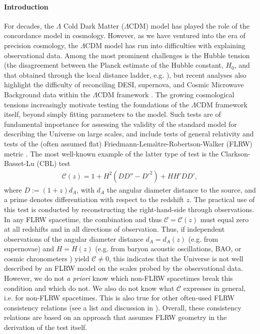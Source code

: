 \documentclass[reprint,aps,prd,nofootinbib,a4paper,10pt,twocolumn,superscriptaddress]{revtex4-2}
\begin{document}
\paragraph*{Introduction}
For decades, the $\Lambda$ Cold Dark Matter ($\Lambda$CDM) model has played the role of the concordance model in cosmology. However, as we have ventured into the era of precision cosmology, the $\Lambda$CDM model has run into difficulties with explaining observational data. Among the most prominent challenges is the Hubble tension (the disagreement between the Planck estimate of the Hubble constant, $H_0$, \cite{planck} and that obtained through the local distance ladder, e.g. \cite{local}), but recent analyses also highlight the difficulty of reconciling DESI, supernova, and Cosmic Microwave Background data within the $\Lambda$CDM framework \cite{DESI:2024mwx}.
\newline\indent
The growing cosmological tensions increasingly motivate testing the foundations of the $\Lambda$CDM framework itself, beyond simply fitting parameters to the model. Such tests are of fundamental importance for assessing the validity of the standard model for describing the Universe on large scales, and include tests of general relativity \cite{Ferreira:2019xrr,GRtest1, GRtest2, GRtest3, Thomas:2025qiz} and tests of the (often assumed flat) Friedmann-Lema\^{\i}tre-Robertson-Walker (FLRW) metric \cite{FLRWtest1, FLRWtest2, Montanari:2017yma, FLRWtest3, cbl, Larena:2008be, Seikel_2012}.
The most well-known example of the latter type of test is the Clarkson-Basset-Lu (CBL) test \cite{cbl}
\begin{align}
\label{eq:C}
    \mathcal{C}(z) = 1 + H^2\left(DD'' - D'^2\right) + HH'DD',
\end{align}
where $D:=(1+z)d_A$, with $d_A$ the angular diameter distance to the source, and a prime denotes differentiation with respect to the redshift $z$. The practical use of this test is conducted by reconstructing the right-hand-side through observations.
In any FLRW spacetime, the combination and thus $\mathcal{C} = \mathcal{C}(z)$ must equal zero at all redshifts and in all directions of observation. Thus, if independent observations of the angular diameter distance $d_A=d_A(z)$ (e.g. from supernovae) and $H=H(z)$ (e.g. from baryon acoustic oscillations, BAO, or cosmic chronometers \cite{Moresco:2022phi}) yield $\mathcal{C}\neq 0$, this indicates that the Universe is not well described by an FLRW model on the scales probed by the observational data. However, we do not {\em a priori} know which non-FLRW spacetimes break this condition and which do not. We also do not know what $\mathcal{C}$ expresses in general, i.e. for non-FLRW spacetimes. This is also true for other often-used FLRW consistency relations (see  a list and discussion in \cite{list}). Overall, these consistency relations are based on an approach that assumes FLRW geometry in the derivation of the test itself.
\end{document}
